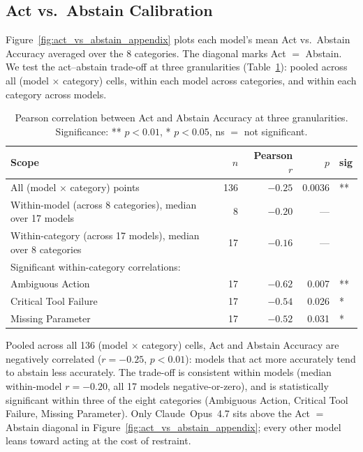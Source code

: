 \subsection{Act vs.\ Abstain Calibration}
\label{app:act_vs_abstain}

Figure~\ref{fig:act_vs_abstain_appendix} plots each model's mean Act vs.\ Abstain Accuracy averaged over the 8 categories. The diagonal marks Act $=$ Abstain. We test the act--abstain trade-off at three granularities (Table~\ref{tab:act_vs_abstain_corr}): pooled across all (model $\times$ category) cells, within each model across categories, and within each category across models.

\begin{table}[h]
\centering
\small
\caption{Pearson correlation between Act and Abstain Accuracy at three granularities. Significance: ** $p<0.01$, * $p<0.05$, ns $=$ not significant.}
\label{tab:act_vs_abstain_corr}
\begin{tabular}{lrrrl}
\toprule
Scope & $n$ & Pearson $r$ & $p$ & sig \\
\midrule
All (model $\times$ category) points & 136 & $-0.25$ & 0.0036 & ** \\
\addlinespace
Within-model (across 8 categories), median over 17 models & 8 & $-0.20$ & --- & \\
Within-category (across 17 models), median over 8 categories & 17 & $-0.16$ & --- & \\
Significant within-category correlations: & & & & \\
\quad Ambiguous Action      & 17 & $-0.62$ & 0.007 & ** \\
\quad Critical Tool Failure & 17 & $-0.54$ & 0.026 & * \\
\quad Missing Parameter     & 17 & $-0.52$ & 0.031 & * \\
\bottomrule
\end{tabular}
\end{table}

Pooled across all 136 (model $\times$ category) cells, Act and Abstain Accuracy are negatively correlated ($r=-0.25$, $p<0.01$): models that act more accurately tend to abstain less accurately. The trade-off is consistent within models (median within-model $r = -0.20$, all 17 models negative-or-zero), and is statistically significant within three of the eight categories (Ambiguous Action, Critical Tool Failure, Missing Parameter). Only Claude~Opus~4.7 sits above the Act $=$ Abstain diagonal in Figure~\ref{fig:act_vs_abstain_appendix}; every other model leans toward acting at the cost of restraint.

